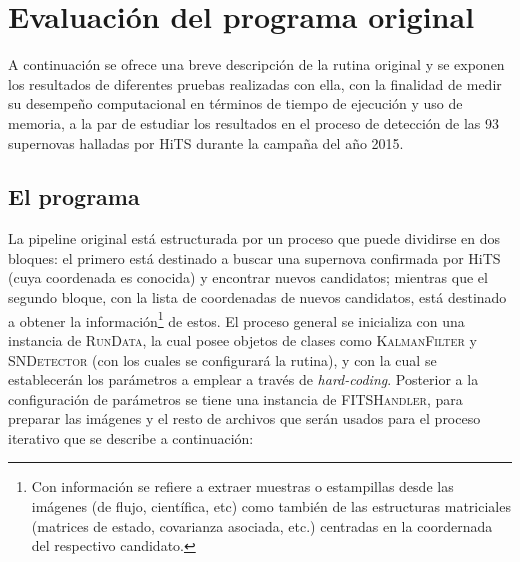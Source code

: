 \chapter{Evaluaci\'on del programa original}
\label{ch:prev_work}

A continuaci\'on se ofrece una breve descripci\'on de la rutina original y se exponen los resultados de diferentes pruebas realizadas con ella, con la finalidad de medir su desempe\~no computacional en t\'erminos de tiempo de ejecuci\'on y uso de memoria, a la par de estudiar los resultados en el proceso de detecci\'on de las 93 supernovas halladas por HiTS durante la campa\~na del a\~no 2015.
\bigskip


\section{El programa}

La pipeline original est\'a estructurada por un proceso que puede dividirse en dos bloques: el primero est\'a destinado a buscar una supernova confirmada por HiTS (cuya coordenada es conocida) y encontrar nuevos candidatos; mientras que el segundo bloque, con la lista de coordenadas de nuevos candidatos, est\'a destinado a obtener la informaci\'on\footnote{Con informaci\'on se refiere a extraer muestras o estampillas desde las im\'agenes (de flujo, cient\'ifica, etc) como tambi\'en de las estructuras matriciales (matrices de estado, covarianza asociada, etc.) centradas en la coordernada del respectivo candidato.} de estos. El proceso general se inicializa con una instancia de \textsc{RunData}, la cual posee objetos de clases como \textsc{KalmanFilter} y \textsc{SNDetector} (con los cuales se configurar\'a la rutina), y con la cual se establecer\'an los par\'ametros a emplear a trav\'es de \textit{hard-coding}. Posterior a la configuraci\'on de par\'ametros se tiene una instancia de \textsc{FITSHandler}, para preparar las im\'agenes y el resto de archivos que ser\'an usados para el proceso iterativo que se describe a continuaci\'on:
\bigskip


